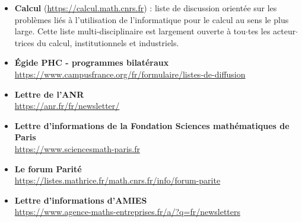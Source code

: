 \begin{itemize}[itemsep = 15pt]
\item {\bf Calcul} (\url{https://calcul.math.cnrs.fr}) : liste de discussion orient\'ee sur les
probl\`emes li\'es \`a l'utilisation de l'informatique pour le calcul au
sens le plus large. Cette liste multi-disciplinaire est largement
ouverte \`a tou$\cdot$tes les acteur$\cdot$trices du calcul, institutionnels et
industriels.

%
\item{\bf \'Egide PHC  - programmes bilat\'eraux}\\
\url{https://www.campusfrance.org/fr/formulaire/listes-de-diffusion}

\item{\bf Lettre de l'ANR}\\
\url{https://anr.fr/fr/newsletter/}


\item{\bf Lettre d'informations de la Fondation Sciences math\'ematiques de Paris}\\
\url{https://www.sciencesmath-paris.fr}

\item {\bf Le forum Parit\'e}\\
\url{https://listes.mathrice.fr/math.cnrs.fr/info/forum-parite}

\item{\bf Lettre d'informations d'AMIES}\\
\url{https://www.agence-maths-entreprises.fr/a/?q=fr/newsletters}

\end{itemize}
